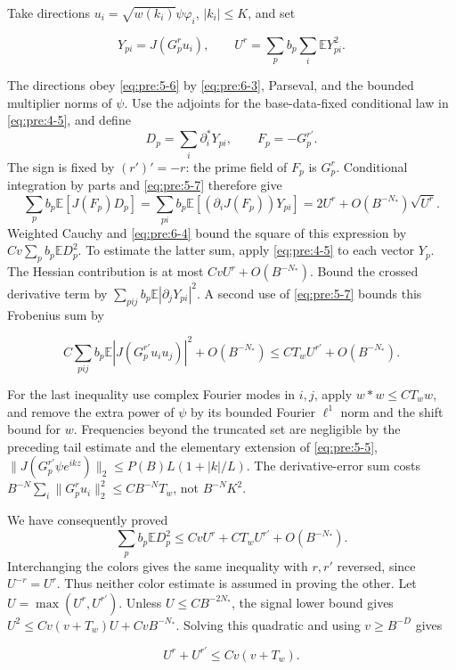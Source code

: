 Take directions \(u_i=\sqrt{w(k_i)}\psi\varphi_i\), \(|k_i|\leq K\), and set

\[
Y_{pi}=J(G_p^ru_i),\qquad
U^r=\sum_pb_p\sum_i\mathbb E Y_{pi}^2.
\]

The directions obey \eqref{eq:pre:5-6} by \eqref{eq:pre:6-3}, Parseval,
and the bounded multiplier norms of \(\psi\). Use the adjoints for the
base-data-fixed conditional law in \eqref{eq:pre:4-5}, and define
\[
 D_p=\sum_i\partial_i^*Y_{pi},\qquad F_p=-G_p^{r'}.
\]
The sign is fixed by \((r')'=-r\): the prime field of \(F_p\) is
\(G_p^r\). Conditional integration by parts and
\eqref{eq:pre:5-7} therefore give
\[
 \sum_pb_p\mathbb E[J(F_p)D_p]
 =\sum_{pi}b_p\mathbb E[(\partial_iJ(F_p))Y_{pi}]
 =2U^r+O(B^{-N_*})\sqrt{U^r}.
\]
Weighted Cauchy and \eqref{eq:pre:6-4} bound the square of this expression
by \(Cv\sum_pb_p\mathbb ED_p^2\). To estimate the latter sum, apply
\eqref{eq:pre:4-5} to each vector \(Y_p\). The Hessian contribution is
at most \(CvU^r+O(B^{-N_*})\). Bound the crossed derivative term by
\(\sum_{pij}b_p\mathbb E|\partial_jY_{pi}|^2\). A second use of
\eqref{eq:pre:5-7} bounds this Frobenius sum by

\begin{equation}
C\sum_{pij}b_p\mathbb E|J(G_p^{r'}u_iu_j)|^2+O(B^{-N_*})
\leq CT_wU^{r'}+O(B^{-N_*}).
\label{eq:pre:6-5}
\end{equation}

For the last inequality use complex Fourier modes in \(i,j\), apply \(w*w\leq CT_ww\), and remove the extra power of \(\psi\) by its bounded Fourier \(\ell^1\) norm and the shift bound for \(w\). Frequencies beyond the truncated set are negligible by the preceding tail estimate and the elementary extension of \eqref{eq:pre:5-5}, \(\|J(G_p^{r'}\psi e^{ikz})\|_2\leq P(B)L(1+|k|/L)\). The derivative-error sum costs \(B^{-N}\sum_i\|G_p^ru_i\|_2^2\leq CB^{-N}T_w\), not \(B^{-N}K^2\).

We have consequently proved
\[
 \sum_pb_p\mathbb ED_p^2
 \leq CvU^r+CT_wU^{r'}+O(B^{-N_*}).
\]
Interchanging the colors gives the same inequality with \(r,r'\)
reversed, since \(U^{-r}=U^r\).
Thus neither color estimate is assumed in proving the other.
Let \(U=\max(U^r,U^{r'})\). Unless \(U\leq CB^{-2N_*}\), the signal lower
bound gives
\(U^2\leq Cv(v+T_w)U+CvB^{-N_*}\).
Solving this quadratic and using \(v\geq B^{-D}\) gives

\begin{equation}
U^r+U^{r'}\leq Cv(v+T_w).
\label{eq:pre:6-6}
\end{equation}

